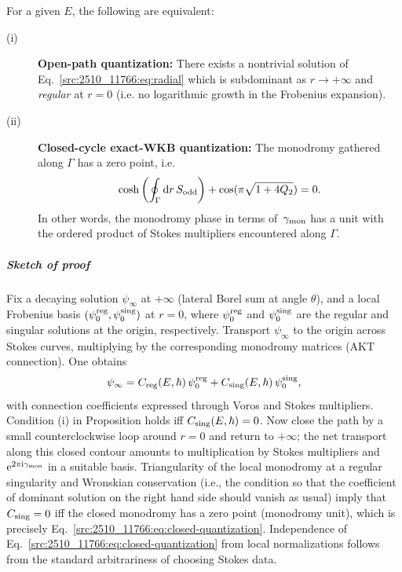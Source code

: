 \begin{proposition}
For a given $E$, the following are equivalent:
\begin{description}
\item[(i)] \textbf{Open-path quantization:} There exists a nontrivial solution of Eq.~\eqref{src:2510_11766:eq:radial} which is subdominant as $r\to+\infty$ and \textit{regular} at $r=0$ (i.e. no logarithmic growth in the Frobenius expansion).
\item[(ii)] \textbf{Closed-cycle exact-WKB quantization:} The monodromy gathered along $\Gamma$ has a zero point, i.e.
\begin{align}
    \label{src:2510_11766:eq:closed-quantization}
    \cosh\left(\oint_\Gamma \mathrm{d} r\, S_{\mathrm{odd}}\right)
    + \cos(\pi\sqrt{1+4Q_2}) = 0 .
\end{align}
In other words, the monodromy phase in terms of~$\gamma_{\mathrm{mon}}$ has a unit with the ordered product of Stokes multipliers encountered along $\Gamma$.
\end{description}
\end{proposition}
\subparagraph{Sketch of proof}
Fix a decaying solution $\psi_\infty$ at $+\infty$ (lateral Borel sum at angle $\theta$), and a local Frobenius basis $(\psi^{\mathrm{reg}}_0,\psi^{\mathrm{sing}}_0)$ at $r=0$, where $\psi^{\mathrm{reg}}_0$ and $\psi^{\mathrm{sing}}_0$ are the regular and singular solutions at the origin, respectively. Transport $\psi_\infty$ to the origin across Stokes curves, multiplying by the corresponding monodromy matrices (AKT connection). One obtains
\begin{align}
    \psi_\infty = C_{\mathrm{reg}}(E,\hbar)\,\psi^{\mathrm{reg}}_0 + C_{\mathrm{sing}}(E,\hbar)\,\psi^{\mathrm{sing}}_0,
\end{align}
with connection coefficients expressed through Voros and Stokes multipliers. Condition (i) in Proposition holds iff $C_{\mathrm{sing}}(E,\hbar)=0$. Now close the path by a small counterclockwise loop around $r=0$ and return to $+\infty$; the net transport along this closed contour amounts to multiplication by Stokes multipliers and~$\mathrm{e}^{2\pi \mathrm{i} \gamma_{\mathrm{mon}}}$ in a suitable basis. Triangularity of the local monodromy at a regular singularity and Wronskian conservation (i.e., the condition so that the coefficient of dominant solution on the right hand side should vanish as usual) imply that $C_{\mathrm{sing}}=0$ iff the closed monodromy has a zero point (monodromy unit), which is precisely Eq.~\eqref{src:2510_11766:eq:closed-quantization}. Independence of Eq.~\eqref{src:2510_11766:eq:closed-quantization} from local normalizations follows from the standard arbitrariness of choosing Stokes data.
